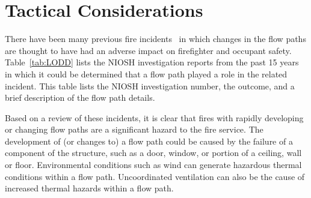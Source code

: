 \documentclass[12pt,oneside]{book}
\begin{document}
%  
% 

\section{Tactical Considerations}
\label{sec:tactical_condsiderations}

There have been many previous fire incidents~\cite{NIOSH:Pettit,NIOSH:Washenitz,NIOSH:Mezzanotte,NIOSH:McFall,NIOSH:McFall2,NIOSH:McFall3,NIOSH:Berardinelli,NIOSH:Koedam,NIOSH:McFall4,NIOSH:Tarley,NIOSH:Braddee,NIOSH:Merinar,NIOSH:Bowyer2,NIOSH:Loflin,NIOSH:Bowyer} in which changes in the flow paths are thought to have had an adverse impact on firefighter and occupant safety. Table~\ref{tab:LODD} lists the NIOSH investigation reports from the past 15 years in which it could be determined that a flow path played a role in the related incident. This table lists the NIOSH investigation number, the outcome, and a brief description of the flow path details.

Based on a review of these incidents, it is clear that fires with rapidly developing or changing flow paths are a significant hazard to the fire service. The development of (or changes to) a flow path could be caused by the failure of a component of the structure, such as a door, window, or portion of a ceiling, wall or floor. Environmental conditions such as wind can generate hazardous thermal conditions within a flow path. Uncoordinated ventilation can also be the cause of increased thermal hazards within a flow path. 

\end{document}

